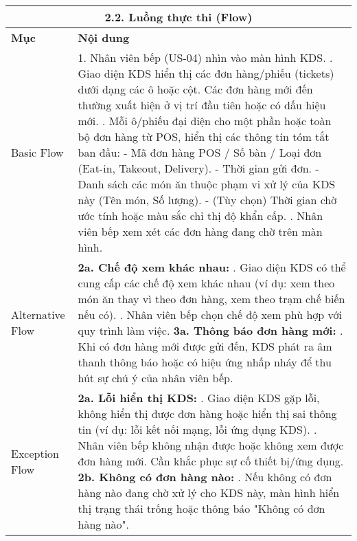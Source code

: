\begin{longtable}{|m{4cm}|p{11cm}|}
\hline
\multicolumn{2}{|c|}{\textbf{2.2. Luồng thực thi (Flow)}} \\
\hline
\textbf{Mục} & \textbf{Nội dung} \\
\hline
Basic Flow & 1. Nhân viên bếp (US-04) nhìn vào màn hình KDS. \newline 2. Giao diện KDS hiển thị các đơn hàng/phiếu (tickets) dưới dạng các ô hoặc cột. Các đơn hàng mới đến thường xuất hiện ở vị trí đầu tiên hoặc có dấu hiệu mới. \newline 3. Mỗi ô/phiếu đại diện cho một phần hoặc toàn bộ đơn hàng từ POS, hiển thị các thông tin tóm tắt ban đầu: \newline    - Mã đơn hàng POS / Số bàn / Loại đơn (Eat-in, Takeout, Delivery). \newline    - Thời gian gửi đơn. \newline    - Danh sách các món ăn thuộc phạm vi xử lý của KDS này (Tên món, Số lượng). \newline    - (Tùy chọn) Thời gian chờ ước tính hoặc màu sắc chỉ thị độ khẩn cấp. \newline 4. Nhân viên bếp xem xét các đơn hàng đang chờ trên màn hình. \\
\hline
Alternative Flow & \textbf{2a. Chế độ xem khác nhau:} \newline    1. Giao diện KDS có thể cung cấp các chế độ xem khác nhau (ví dụ: xem theo món ăn thay vì theo đơn hàng, xem theo trạm chế biến nếu có). \newline    2. Nhân viên bếp chọn chế độ xem phù hợp với quy trình làm việc. \newline \textbf{3a. Thông báo đơn hàng mới:} \newline    1. Khi có đơn hàng mới được gửi đến, KDS phát ra âm thanh thông báo hoặc có hiệu ứng nhấp nháy để thu hút sự chú ý của nhân viên bếp. \\
\hline
Exception Flow & \textbf{2a. Lỗi hiển thị KDS:} \newline    1. Giao diện KDS gặp lỗi, không hiển thị được đơn hàng hoặc hiển thị sai thông tin (ví dụ: lỗi kết nối mạng, lỗi ứng dụng KDS). \newline    2. Nhân viên bếp không nhận được hoặc không xem được đơn hàng mới. Cần khắc phục sự cố thiết bị/ứng dụng. \newline \textbf{2b. Không có đơn hàng nào:} \newline    1. Nếu không có đơn hàng nào đang chờ xử lý cho KDS này, màn hình hiển thị trạng thái trống hoặc thông báo "Không có đơn hàng nào". \\

\end{longtable}
